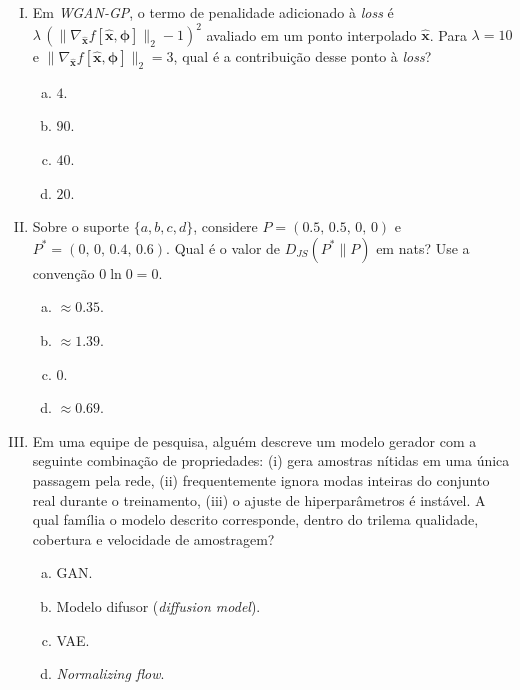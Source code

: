 \documentclass{dlproblemset}
\begin{document}
\begin{enumerate}[I)]
\item Em \textit{WGAN-GP}, o termo de penalidade adicionado à \emph{loss} é $\lambda\,(\|\nabla_{\hat{\mathbf{x}}} f[\hat{\mathbf{x}},\boldsymbol{\phi}]\|_{2} - 1)^{2}$ avaliado em um ponto interpolado $\hat{\mathbf{x}}$. Para $\lambda = 10$ e $\|\nabla_{\hat{\mathbf{x}}} f[\hat{\mathbf{x}},\boldsymbol{\phi}]\|_{2} = 3$, qual é a contribuição desse ponto à \emph{loss}?
\begin{enumerate}[(a)]
    \item $4$.
    \item $90$.
    \item $40$.
    \item $20$.
\end{enumerate}

\item {} Sobre o suporte $\{a, b, c, d\}$, considere $P = (0.5,\, 0.5,\, 0,\, 0)$ e $P^{*} = (0,\, 0,\, 0.4,\, 0.6)$. Qual é o valor de $D_{JS}(P^{*}\|P)$ em nats? Use a convenção $0\ln 0 = 0$.
\begin{enumerate}[(a)]
    \item $\approx 0.35$.
    \item $\approx 1.39$.
    \item $0$.
    \item $\approx 0.69$.
\end{enumerate}

\item Em uma equipe de pesquisa, alguém descreve um modelo gerador com a seguinte combinação de propriedades: (i) gera amostras nítidas em uma única passagem pela rede, (ii) frequentemente ignora modas inteiras do conjunto real durante o treinamento, (iii) o ajuste de hiperparâmetros é instável. A qual família o modelo descrito corresponde, dentro do trilema qualidade, cobertura e velocidade de amostragem?
\begin{enumerate}[(a)]
    \item GAN.
    \item Modelo difusor (\textit{diffusion model}).
    \item VAE.
    \item \textit{Normalizing flow}.
\end{enumerate}


\end{enumerate}
\end{document}
